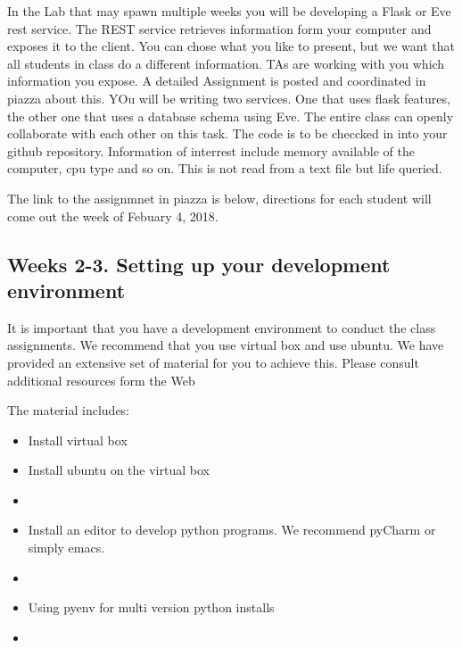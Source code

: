 In the Lab that may spawn multiple weeks you will be developing a
Flask or Eve rest service.  The REST service retrieves information
form your computer and exposes it to the client. You can chose what
you like to present, but we want that all students in class do a
different information. TAs are working with you which information you
expose. A detailed Assignment is posted and coordinated in piazza
about this. YOu will be writing two services. One that uses flask
features, the other one that uses a database schema using Eve. The
entire class can openly collaborate with each other on this task. The
code is to be checcked in into your github repository. Information of
interrest include memory available of the computer, cpu type and so
on. This is not read from a text file but life queried.


The link to the assignmnet in piazza is below, directions for each student will come out the week of Febuary 4, 2018. 


\subsection{Weeks 2-3. Setting up your development environment}

It is important that you have a development environment to conduct the
class assignments. We recommend that you use virtual box and use
ubuntu. We have provided an extensive set of material for you to
achieve this. Please consult additional resources form the Web

The material includes:


\begin{itemize}
\item Install virtual box

\item Install ubuntu on the virtual box

\item {}

\item Install an editor to develop python programs. We recommend
  pyCharm or simply emacs.

\item {}

\item Using pyenv for multi version python installs

\item {}

\end{itemize}

